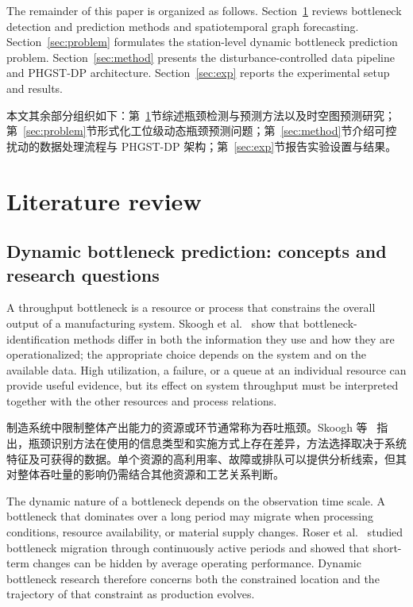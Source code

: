 \documentclass[a4paper,fleqn]{cas-dc}
\newcommand{\zhpara}[1]{%
  \par\begingroup\small\color{black!72}\noindent #1\par\endgroup}
\begin{document}
The remainder of this paper is organized as follows. Section~\ref{sec:review} reviews bottleneck detection and prediction methods and spatiotemporal graph forecasting. Section~\ref{sec:problem} formulates the station-level dynamic bottleneck prediction problem. Section~\ref{sec:method} presents the disturbance-controlled data pipeline and PHGST-DP architecture. Section~\ref{sec:exp} reports the experimental setup and results.

\zhpara{本文其余部分组织如下：第~\ref{sec:review}节综述瓶颈检测与预测方法以及时空图预测研究；第~\ref{sec:problem}节形式化工位级动态瓶颈预测问题；第~\ref{sec:method}节介绍可控扰动的数据处理流程与 PHGST-DP 架构；第~\ref{sec:exp}节报告实验设置与结果。}

\section{Literature review} \label{sec:review}

\subsection{Dynamic bottleneck prediction: concepts and research questions}

A throughput bottleneck is a resource or process that constrains the overall output of a manufacturing system. Skoogh et al.~\cite{subramaniyan2023throughput} show that bottleneck-identification methods differ in both the information they use and how they are operationalized; the appropriate choice depends on the system and on the available data. High utilization, a failure, or a queue at an individual resource can provide useful evidence, but its effect on system throughput must be interpreted together with the other resources and process relations.

\zhpara{制造系统中限制整体产出能力的资源或环节通常称为吞吐瓶颈。Skoogh 等~\cite{subramaniyan2023throughput} 指出，瓶颈识别方法在使用的信息类型和实施方式上存在差异，方法选择取决于系统特征及可获得的数据。单个资源的高利用率、故障或排队可以提供分析线索，但其对整体吞吐量的影响仍需结合其他资源和工艺关系判断。}

The dynamic nature of a bottleneck depends on the observation time scale. A bottleneck that dominates over a long period may migrate when processing conditions, resource availability, or material supply changes. Roser et al.~\cite{roser2002shifting} studied bottleneck migration through continuously active periods and showed that short-term changes can be hidden by average operating performance. Dynamic bottleneck research therefore concerns both the constrained location and the trajectory of that constraint as production evolves.
\end{document}

